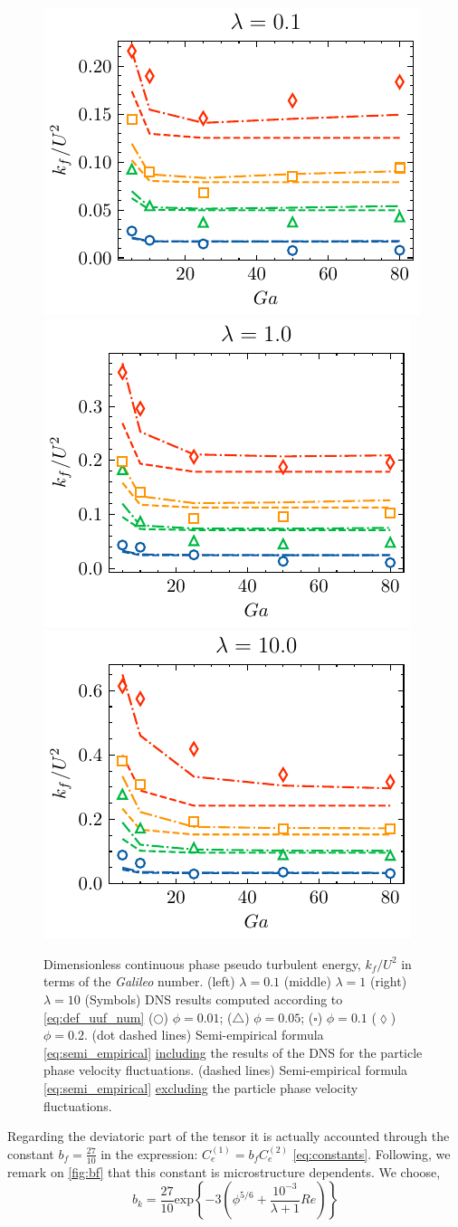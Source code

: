 \begin{figure}
    \centering
    \includegraphics[height = 0.25\textwidth]{image/HOMOGENEOUS_final/CA/KF2_l_0.pdf}
    \includegraphics[height = 0.25\textwidth]{image/HOMOGENEOUS_final/CA/KF2_l_1.pdf}
    \includegraphics[height = 0.25\textwidth]{image/HOMOGENEOUS_final/CA/KF2_l_10.pdf}
    \caption{Dimensionless continuous phase pseudo turbulent energy, $k_f/U^2$ in terms of the \textit{Galileo} number.
    (left) $\lambda = 0.1$
    (middle) $\lambda = 1$
    (right) $\lambda = 10$
    (Symbols) DNS results computed according to \ref{eq:def_uuf_num}
    ($\pmb\bigcirc$) $\phi = 0.01$; ($\pmb\triangle$) $ \phi = 0.05$; ($\pmb\square$) $\phi = 0.1$ ($\pmb\lozenge$) $\phi = 0.2$.
    (dot dashed lines) Semi-empirical formula \ref{eq:semi_empirical} \underline{including} the results of the DNS for the particle phase velocity fluctuations. 
    (dashed lines) Semi-empirical formula \ref{eq:semi_empirical} \underline{excluding} the particle phase velocity fluctuations. 
    }
    \label{fig:kf}
\end{figure}


Regarding the deviatoric part of the tensor it is actually accounted through the constant $b_f = \frac{27}{10}$ in the expression: $C_e^{(1)} = b_f C_e^{(2)}$ \ref{eq:constants}. 
Following, \citet{mehrabadi2015pseudo} we remark on \ref{fig:bf} that this constant is microstructure dependents. 
We choose, 
\begin{equation*}
    b_k = \frac{27}{10}  \text{exp}\left\{- 3\left(\phi^{5/6} + \frac{10^{-3}}{\lambda+1}Re\right)\right\}
\end{equation*}

